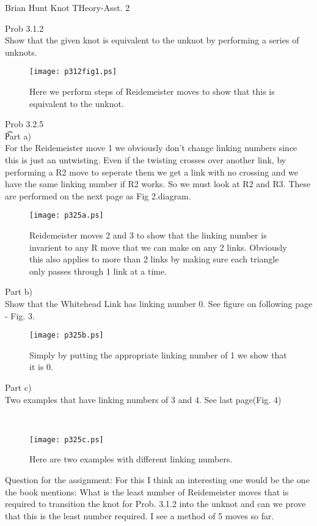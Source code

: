 \documentclass{article}
\begin{document}
{\Large Brian Hunt}
{\Large Knot THeory-Asst. 2}


Prob 3.1.2
\\
Show that the given knot is equivalent to the unknot by performing a series of unknots.
\\
\begin{figure}[htbp]
\begin{center}
\texttt{[image: p312fig1.ps]}
\end{center}
\caption{Here we perform steps of Reidemeister moves to show that this is equivalent to the unknot.}
\end{figure}


Prob 3.2.5
\\ \t Part a)
\\For the Reidemeister move 1 we obviously don't change linking numbers since this is just an untwisting. Even if the twisting crosses over another link, by  performing a R2 move to seperate them we get a link with no crossing and we have the same linking number if R2 works. So we must look at R2 and R3. These are performed on the next page as Fig 2.diagram.
\begin{figure}[htp]
\begin{center}
\texttt{[image: p325a.ps]}
\end{center}
\caption{Reidemeister moves 2 and 3 to show that the linking number is invarient to any R move that we can make on any 2 links. Obviously this also applies to more than 2 links by making sure each triangle only passes through 1 link at a time.}
\end{figure}

Part b)
\\Show that the Whitehead Link has linking number 0. See figure on following page - Fig. 3.
\begin{figure}[htp]
\begin{center}
\texttt{[image: p325b.ps]}
\end{center}
\caption{Simply by putting the appropriate linking number of 1 we show that it is 0.}
\end{figure}

Part c)
\\ Two examples that have linking numbers of 3 and 4. See last page(Fig. 4)

\\
\begin{figure}[htp]
\begin{center}
\texttt{[image: p325c.ps]}
\end{center}
\caption{Here are two examples with different linking numbers.}
\end{figure}

Question for the assignment: For this I think an interesting one would be the one the book mentions: What is the least number of Reidemeister moves that is required to transition the knot for Prob. 3.1.2 into the unknot and can we prove that this is the least number required. I see a method of 5 moves so far. 
\end{document}
